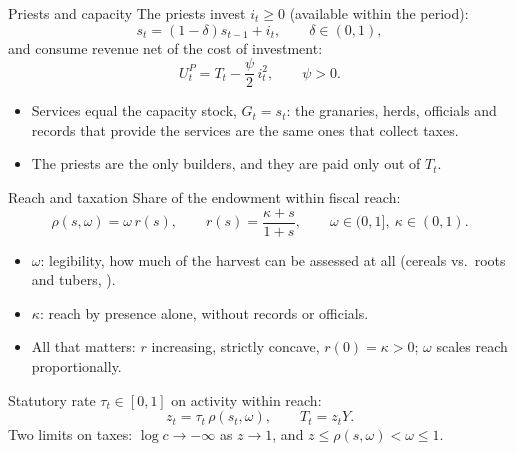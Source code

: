 \documentclass[11pt,aspectratio=169]{beamer}
\begin{document}
\begin{frame}{Priests and capacity}
The priests invest $i_t\ge0$ (available within the period):
\[
s_t=(1-\delta)s_{t-1}+i_t,\qquad \delta\in(0,1),
\]
and consume revenue net of the cost of investment:
\[
U^P_t=T_t-\frac{\psi}{2}\,i_t^2,\qquad \psi>0 .
\]
\begin{itemize}
\item Services equal the capacity stock, $G_t=s_t$: the granaries, herds, officials and records
that provide the services are the same ones that collect taxes.
\item The priests are the only builders, and they are paid only out of $T_t$.
\end{itemize}
\end{frame}

\begin{frame}{Reach and taxation}
Share of the endowment within fiscal reach:
\[
\rho(s,\omega)=\omega\,r(s),\qquad r(s)=\frac{\kappa+s}{1+s},\qquad
\omega\in(0,1],\ \kappa\in(0,1).
\]
\begin{itemize}
\item $\omega$: \alert{legibility}, how much of the harvest can be assessed at all (cereals vs.\
roots and tubers, \citealp{mayshar2017,mayshar2022}).
\item $\kappa$: reach by presence alone, without records or officials.
\item All that matters: $r$ increasing, strictly concave, $r(0)=\kappa>0$; $\omega$ scales reach
proportionally.
\end{itemize}
Statutory rate $\tau_t\in[0,1]$ on activity within reach:
\[
z_t=\tau_t\,\rho(s_t,\omega),\qquad T_t=z_tY .
\]
Two limits on taxes: $\log c\to-\infty$ as $z\to1$, and $z\le\rho(s,\omega)<\omega\le1$.
\end{frame}
\end{document}
